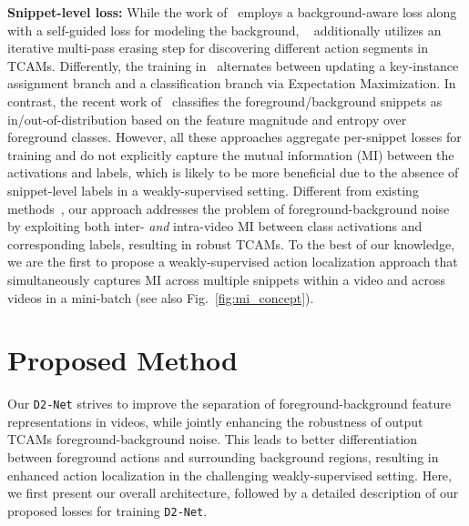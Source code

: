 \documentclass[10pt,twocolumn,letterpaper]{article}
\def\proposed{\texttt{D2-Net}{}}
\begin{document}
\noindent\textbf{Snippet-level loss:} While the work of~\cite{bg-modeling} employs a background-aware loss along with a self-guided loss for modeling the background, ~\cite{moniruzzaman2020action} additionally utilizes an iterative multi-pass erasing step for discovering different action segments in TCAMs.
Differently, the training in~\cite{luo2020emmil} alternates between updating a key-instance assignment branch and a classification branch via Expectation Maximization. 
In contrast, the recent work of~\cite{uncertainty2020lee} classifies the foreground/background snippets as in/out-of-distribution based on the feature magnitude and entropy over foreground classes.
However, all these approaches aggregate per-snippet losses for training and do not explicitly capture the mutual information (MI) between the activations and labels, which is likely to be more beneficial due to the absence of snippet-level labels in a weakly-supervised setting.
Different from existing methods~\cite{bg-modeling,moniruzzaman2020action,luo2020emmil,uncertainty2020lee,3cnet,stpn,refineloc,dml}, our approach addresses the problem of foreground-background noise by exploiting both inter- \textit{and} intra-video MI between class activations and corresponding labels, resulting in robust TCAMs. 
To the best of our knowledge, we are the first to propose a weakly-supervised action localization approach that simultaneously captures MI across multiple snippets within a video and across videos in a mini-batch (see also Fig.~\ref{fig:mi_concept}). 







\section{Proposed Method\label{sec:method}}
Our \proposed{} strives to improve the separation of foreground-background feature representations in videos, while jointly enhancing the robustness of output TCAMs \wrt foreground-background noise.
This leads to better differentiation between foreground actions and surrounding background regions, resulting in enhanced action localization in the challenging weakly-supervised setting.
Here, we first present our overall architecture, followed by a detailed description of our proposed losses for training \proposed. 
\end{document}
